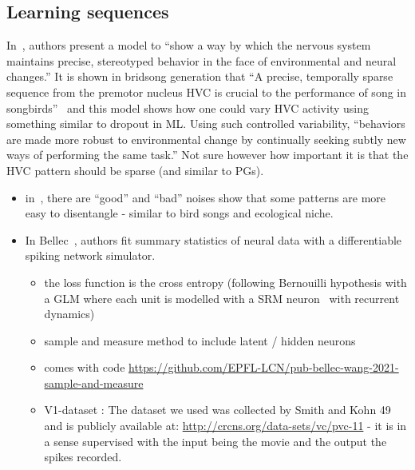 \documentclass[brainsci, %
               review,submit,pdftex,moreauthors]{Definitions/mdpi}
\begin{document}
\subsection{Learning sequences}\label{learning-sequences}
In~\citep{duffy_variation_2019}, authors present a model to ``show a way by which the nervous system maintains precise, stereotyped behavior in the face of environmental and neural changes.'' It is shown in bridsong generation that ``A precise, temporally sparse sequence from the premotor nucleus HVC is crucial to the performance of song in songbirds''~\citep{suthers_motor_2002,wild_descending_1993,yu_temporal_1996} and this model shows how one could vary HVC activity using something similar to dropout in ML. Using such controlled variability, ``behaviors are made more robust to environmental change by continually seeking subtly new ways of performing the same task.'' Not sure however how important it is that the HVC pattern should be sparse (and similar to PGs).

\begin{itemize}
\item
  in~\citep{agus_rapid_2010}, there are ``good'' and ``bad'' noises show that some patterns are more easy to disentangle - similar to bird songs and ecological niche.
\item
  In Bellec~\citep{bellec_fitting_2021}, authors fit summary statistics of neural data with a differentiable spiking network simulator.

  \begin{itemize}
     \item
    the loss function is the cross entropy (following Bernouilli hypothesis with a GLM where each unit is modelled with a SRM neuron~\citep{gerstner_time_1995} with recurrent dynamics)
  \item
    sample and measure method to include latent / hidden neurons
  \item
    comes with code \url{https://github.com/EPFL-LCN/pub-bellec-wang-2021-sample-and-measure}
  \item
    V1-dataset : The dataset we used was collected by Smith and Kohn 49 and is publicly available at:
     \url{http://crcns.org/data-sets/vc/pvc-11} - it is in a sense supervised with the input being the movie and the output the spikes recorded.
  \end{itemize}
\end{itemize}
\end{document}
